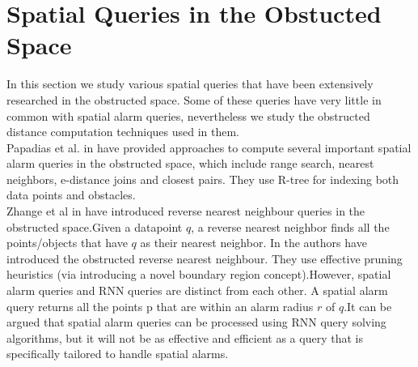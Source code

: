 \vspace{10pt}


\section{\label{sec:obstructed}Spatial Queries in the Obstucted Space}
In this section we study various spatial queries that have been extensively researched in the obstructed space. Some of these queries have very little in common with spatial alarm queries, nevertheless we study the obstructed distance computation techniques used in them.\\

Papadias et al. in \cite{Obst1} have provided approaches to compute several important spatial alarm queries in the obstructed space, which include range search, nearest neighbors, e-distance joins and closest pairs. They use R-tree for indexing both data points and obstacles.  \\

Zhange et al in \cite{obst2} have introduced reverse nearest neighbour queries in the obstructed space.Given a datapoint $q$, a reverse nearest neighbor finds all the points/objects that have $q$ as their nearest neighbor. In \cite{obst2} the authors have introduced the obstructed reverse nearest neighbour. They use effective pruning heuristics (via introducing a novel boundary region concept).However, spatial alarm queries and RNN queries are distinct from each other. A spatial alarm query returns all the points p that are within an alarm radius $r$ of $q$.It can be argued that spatial alarm queries can be processed using RNN query solving algorithms, but it will not be as effective and efficient as a query that is specifically tailored to handle spatial alarms.\\ 


